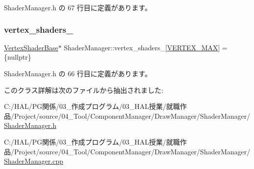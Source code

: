  Shader\+Manager.\+h の 67 行目に定義があります。

\mbox{\label{class_shader_manager_a56ae173a708111646ae72973f623b036}} 
\subsubsection{\texorpdfstring{vertex\+\_\+shaders\+\_\+}{vertex\_shaders\_}}
{\footnotesize\ttfamily \mbox{\hyperlink{class_vertex_shader_base}{Vertex\+Shader\+Base}}$\ast$ Shader\+Manager\+::vertex\+\_\+shaders\+\_\+\mbox{[}\mbox{\hyperlink{class_shader_manager_a9b51e49d70eb3cc58f6d1f3994e8cfbda2a90d8502c5060ffb7b4a7d1c1f0e940}{V\+E\+R\+T\+E\+X\+\_\+\+M\+AX}}\mbox{]} = \{nullptr\}\hspace{0.3cm}{\ttfamily [private]}}



 Shader\+Manager.\+h の 66 行目に定義があります。



このクラス詳解は次のファイルから抽出されました\+:\begin{DoxyCompactItemize}
\item 
C\+:/\+H\+A\+L/\+P\+G関係/03\+\_\+作成プログラム/03\+\_\+\+H\+A\+L授業/就職作品/\+Project/source/04\+\_\+\+Tool/\+Component\+Manager/\+Draw\+Manager/\+Shader\+Manager/\mbox{\hyperlink{_shader_manager_8h}{Shader\+Manager.\+h}}\item 
C\+:/\+H\+A\+L/\+P\+G関係/03\+\_\+作成プログラム/03\+\_\+\+H\+A\+L授業/就職作品/\+Project/source/04\+\_\+\+Tool/\+Component\+Manager/\+Draw\+Manager/\+Shader\+Manager/\mbox{\hyperlink{_shader_manager_8cpp}{Shader\+Manager.\+cpp}}\end{DoxyCompactItemize}

